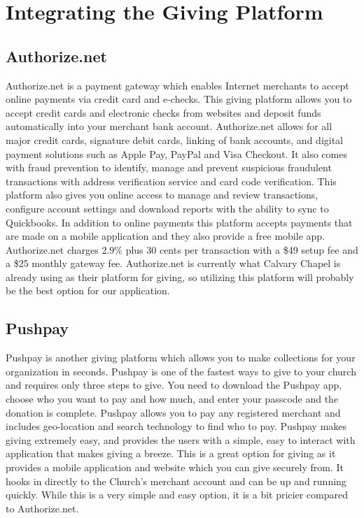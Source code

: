 \documentclass[letterpaper,10pt,draftclsnofoot,onecolumn,titlepage]{IEEEtran}
\begin{document}
	\section{Integrating the Giving Platform}
	\subsection{Authorize.net}
		Authorize.net is a payment gateway which enables Internet merchants to accept online payments via credit card and e-checks. \cite{Authorize.net}
		This giving platform allows you to accept credit cards and electronic checks from websites and deposit funds automatically into your merchant bank account.
		Authorize.net allows for all major credit cards, signature debit cards, linking of bank accounts, and digital payment solutions such as Apple Pay, PayPal and Visa Checkout.
		It also comes with fraud prevention to identify, manage and prevent suspicious fraudulent transactions with address verification service and card code verification.
		This platform also gives you online access to manage and review transactions, configure account settings and download reports with the ability to sync to Quickbooks.
		In addition to online payments this platform accepts payments that are made on a mobile application and they also provide a free mobile app.
		Authorize.net charges 2.9\% plus 30 cents per transaction with a \$49 setup fee and a \$25 monthly gateway fee.
		Authorize.net is currently what Calvary Chapel is already using as their platform for giving, so utilizing this platform will probably be the best option for our application.

	\subsection{Pushpay}
		Pushpay is another giving platform which allows you to make collections for your organization in seconds. \cite{Pushpay}
		Pushpay is one of the fastest ways to give to your church and requires only three steps to give.
		You need to download the Pushpay app, choose who you want to pay and how much, and enter your passcode and the donation is complete.
		Pushpay allows you to pay any registered merchant and includes geo-location and search technology to find who to pay.
		Pushpay makes giving extremely easy, and provides the users with a simple, easy to interact with application that makes giving a breeze.
		This is a great option for giving as it provides a mobile application and website which you can give securely from.
		It hooks in directly to the Church's merchant account and can be up and running quickly.
		While this is a very simple and easy option, it is a bit pricier compared to Authorize.net.
\end{document}
